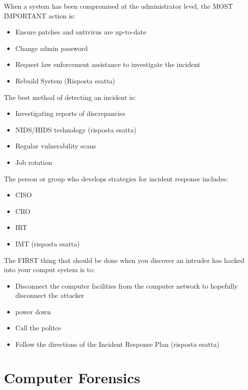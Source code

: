 When a system has been compromised at the administrator level, the MOST 
IMPORTANT action is:
\begin{itemize}
\item Ensure patches and antivirus are up-to-date 
\item Change admin password
\item Request law enforcement assistance to investigate the incident
\item Rebuild System (Risposta esatta)
\end{itemize}


The best method of detecting an incident is:
\begin{itemize}
\item Investigating reports of discrepancies
\item NIDS/HIDS technology (risposta esatta)
\item Regular vulnerability scans
\item Job rotation
\end{itemize}


The person or group who develops strategies for incident response includes:
\begin{itemize}
\item CISO
\item CRO
\item IRT
\item IMT (risposta esatta)
\end{itemize}

The FIRST thing that should be done when you discover an intruder has hacked 
into your comput system is to:
\begin{itemize}
\item Disconnect the computer facilities from the computer network to hopefully 
disconnect the attacker
\item power down 
\item Call the politce
\item Follow the directions of the Incident Response Plan (risposta esatta)
\end{itemize}


\chapter{Computer Forensics}

